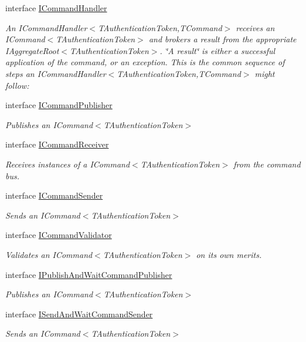 \begin{DoxyCompactItemize}
interface \hyperlink{interfaceCqrs_1_1Commands_1_1ICommandHandler}{I\+Command\+Handler}
\begin{DoxyCompactList}\small\item\em An I\+Command\+Handler$<$\+T\+Authentication\+Token,\+T\+Command$>$ receives an I\+Command$<$\+T\+Authentication\+Token$>$ and brokers a result from the appropriate I\+Aggregate\+Root$<$\+T\+Authentication\+Token$>$. \char`\"{}\+A result\char`\"{} is either a successful application of the command, or an exception. This is the common sequence of steps an I\+Command\+Handler$<$\+T\+Authentication\+Token,\+T\+Command$>$ might follow\+: \end{DoxyCompactList}\item 
interface \hyperlink{interfaceCqrs_1_1Commands_1_1ICommandPublisher}{I\+Command\+Publisher}
\begin{DoxyCompactList}\small\item\em Publishes an I\+Command$<$\+T\+Authentication\+Token$>$ \end{DoxyCompactList}\item 
interface \hyperlink{interfaceCqrs_1_1Commands_1_1ICommandReceiver}{I\+Command\+Receiver}
\begin{DoxyCompactList}\small\item\em Receives instances of a I\+Command$<$\+T\+Authentication\+Token$>$ from the command bus. \end{DoxyCompactList}\item 
interface \hyperlink{interfaceCqrs_1_1Commands_1_1ICommandSender}{I\+Command\+Sender}
\begin{DoxyCompactList}\small\item\em Sends an I\+Command$<$\+T\+Authentication\+Token$>$ \end{DoxyCompactList}\item 
interface \hyperlink{interfaceCqrs_1_1Commands_1_1ICommandValidator}{I\+Command\+Validator}
\begin{DoxyCompactList}\small\item\em Validates an I\+Command$<$\+T\+Authentication\+Token$>$ on its own merits. \end{DoxyCompactList}\item 
interface \hyperlink{interfaceCqrs_1_1Commands_1_1IPublishAndWaitCommandPublisher}{I\+Publish\+And\+Wait\+Command\+Publisher}
\begin{DoxyCompactList}\small\item\em Publishes an I\+Command$<$\+T\+Authentication\+Token$>$ \end{DoxyCompactList}\item 
interface \hyperlink{interfaceCqrs_1_1Commands_1_1ISendAndWaitCommandSender}{I\+Send\+And\+Wait\+Command\+Sender}
\begin{DoxyCompactList}\small\item\em Sends an I\+Command$<$\+T\+Authentication\+Token$>$ \end{DoxyCompactList}\end{DoxyCompactItemize}
